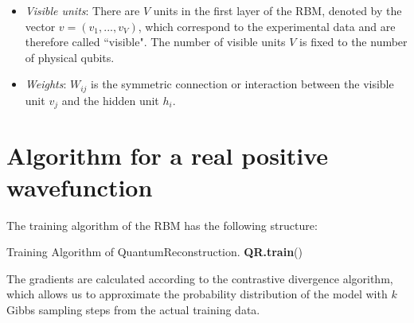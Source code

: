\documentclass[submission, Phys]{SciPost}
\begin{document}
\begin{itemize}
	\item {\it Visible units}: There are $V$ units in the first layer of the RBM, denoted by the vector $v=(v_1, ..., v_V)$, which correspond to the experimental data and are therefore called ``visible". The number of visible units $V$ is fixed to the number of physical qubits.

	\item {\it Weights}: $W_{ij}$ is the symmetric connection or interaction between the visible unit $v_j$ and the hidden unit $h_i$.

\end{itemize}



	\section{Algorithm for a real positive wavefunction}
	The training algorithm of the RBM has the following structure:

	\begin{algorithm}[H]
		\caption{Training Algorithm of QuantumReconstruction. \textbf{QR.train}() }
		\SetAlgoLined

	\end{algorithm}


	The gradients are calculated according to the contrastive divergence algorithm, which allows us to approximate the probability distribution of the model with $k$ Gibbs sampling steps from the actual training data.
\end{document}
